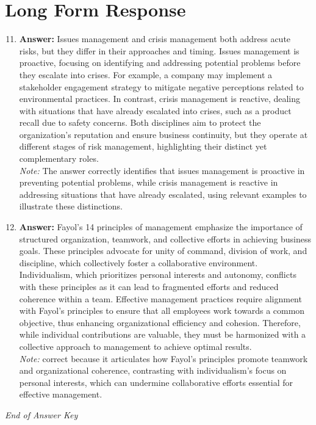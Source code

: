 \documentclass[12pt]{article}
\begin{document}
\section*{Long Form Response}
\begin{enumerate}[label=\arabic*.]
\setcounter{enumi}{10}
\item \textbf{Answer:} Issues management and crisis management both address acute risks, but they differ in their approaches and timing. Issues management is proactive, focusing on identifying and addressing potential problems before they escalate into crises. For example, a company may implement a stakeholder engagement strategy to mitigate negative perceptions related to environmental practices. In contrast, crisis management is reactive, dealing with situations that have already escalated into crises, such as a product recall due to safety concerns. Both disciplines aim to protect the organization's reputation and ensure business continuity, but they operate at different stages of risk management, highlighting their distinct yet complementary roles.
\\ \textit{Note:} The answer correctly identifies that issues management is proactive in preventing potential problems, while crisis management is reactive in addressing situations that have already escalated, using relevant examples to illustrate these distinctions.
\item \textbf{Answer:} Fayol's 14 principles of management emphasize the importance of structured organization, teamwork, and collective efforts in achieving business goals. These principles advocate for unity of command, division of work, and discipline, which collectively foster a collaborative environment. Individualism, which prioritizes personal interests and autonomy, conflicts with these principles as it can lead to fragmented efforts and reduced coherence within a team. Effective management practices require alignment with Fayol's principles to ensure that all employees work towards a common objective, thus enhancing organizational efficiency and cohesion. Therefore, while individual contributions are valuable, they must be harmonized with a collective approach to management to achieve optimal results.
\\ \textit{Note:} correct because it articulates how Fayol's principles promote teamwork and organizational coherence, contrasting with individualism's focus on personal interests, which can undermine collaborative efforts essential for effective management.
\end{enumerate}

\vfill
\noindent\textit{End of Answer Key}
\end{document}
